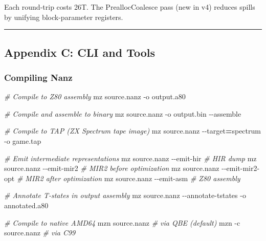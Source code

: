 \documentclass[
  11pt,
  a4paper,
]{report}
\newenvironment{Shaded}{\begin{snugshade}\small}{\end{snugshade}}
\newcommand{\AttributeTok}[1]{\textcolor[rgb]{0.13,0.29,0.53}{#1}}
\newcommand{\CommentTok}[1]{\textcolor[rgb]{0.56,0.35,0.01}{\textit{#1}}}
\newcommand{\ExtensionTok}[1]{#1}
\newcommand{\NormalTok}[1]{#1}
\newcommand{\OperatorTok}[1]{\textcolor[rgb]{0.81,0.36,0.00}{\textbf{#1}}}
\begin{document}
\begin{Shaded}
\end{Shaded}

Each round-trip costs 26T. The PreallocCoalesce pass (new in v4) reduces
spills by unifying block-parameter registers.

\begin{center}\rule{0.5\linewidth}{0.5pt}\end{center}

\subsection{Appendix C: CLI and Tools}\label{appendix-c-cli-and-tools}

\subsubsection{Compiling Nanz}\label{compiling-nanz}

\begin{Shaded}
\begin{Highlighting}[]
\CommentTok{\# Compile to Z80 assembly}
\ExtensionTok{mz}\NormalTok{ source.nanz }\AttributeTok{{-}o}\NormalTok{ output.a80}

\CommentTok{\# Compile and assemble to binary}
\ExtensionTok{mz}\NormalTok{ source.nanz }\AttributeTok{{-}o}\NormalTok{ output.bin }\AttributeTok{{-}{-}assemble}

\CommentTok{\# Compile to TAP (ZX Spectrum tape image)}
\ExtensionTok{mz}\NormalTok{ source.nanz }\AttributeTok{{-}{-}target}\OperatorTok{=}\NormalTok{spectrum }\AttributeTok{{-}o}\NormalTok{ game.tap}

\CommentTok{\# Emit intermediate representations}
\ExtensionTok{mz}\NormalTok{ source.nanz }\AttributeTok{{-}{-}emit{-}hir}        \CommentTok{\# HIR dump}
\ExtensionTok{mz}\NormalTok{ source.nanz }\AttributeTok{{-}{-}emit{-}mir2}       \CommentTok{\# MIR2 before optimization}
\ExtensionTok{mz}\NormalTok{ source.nanz }\AttributeTok{{-}{-}emit{-}mir2{-}opt}   \CommentTok{\# MIR2 after optimization}
\ExtensionTok{mz}\NormalTok{ source.nanz }\AttributeTok{{-}{-}emit{-}asm}        \CommentTok{\# Z80 assembly}

\CommentTok{\# Annotate T{-}states in output assembly}
\ExtensionTok{mz}\NormalTok{ source.nanz }\AttributeTok{{-}{-}annotate{-}tstates} \AttributeTok{{-}o}\NormalTok{ annotated.a80}

\CommentTok{\# Compile to native AMD64}
\ExtensionTok{mzn}\NormalTok{ source.nanz                  }\CommentTok{\# via QBE (default)}
\ExtensionTok{mzn} \AttributeTok{{-}c}\NormalTok{ source.nanz               }\CommentTok{\# via C99}
\end{Highlighting}
\end{Shaded}
\end{document}
